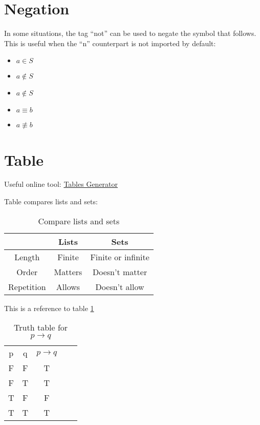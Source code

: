 \documentclass[12pt, letterpaper, oneside]{article}
\begin{document}
\section{Negation}

In some situations, the tag ``not'' can be used to negate the symbol that follows. This is useful when the ``n''
counterpart is not imported by default:

\begin{itemize}
  \item $a \in S$
  \item $a \notin S$
  \item $a \not\in S$
  \item $a \equiv b$
  \item $a \not\equiv b$
\end{itemize}

\section{Table}

Useful online tool: \href{https://www.tablesgenerator.com/}{Tables Generator}

Table compares lists and sets:
\begin{table}[H]
  \centering
  \begin{tabular}{||c c c ||}
    \hline
               & Lists   & Sets               \\ [0.5ex]
    \hline
    \hline
    Length     & Finite  & Finite or infinite \\
    Order      & Matters & Doesn't matter     \\
    Repetition & Allows  & Doesn't allow      \\ [1ex]
    \hline
  \end{tabular}
  \caption{Compare lists and sets}
  \label{table:lists_sets_comp}
\end{table}

This is a reference to table \ref{table:lists_sets_comp}

\begin{table}[H]
  \centering
  \begin{tabular}{|c|c|c|ll}
    \cline{1-3}
    p & q & $p \rightarrow q$ &  & \\ [1ex] \cline{1-3}
    F & F & T                 &  & \\ [0.5ex] \cline{1-3}
    F & T & T                 &  & \\ [0.5ex] \cline{1-3}
    T & F & F                 &  & \\ [0.5ex] \cline{1-3}
    T & T & T                 &  & \\ [0.5ex] \cline{1-3}
  \end{tabular}
  \caption{Truth table for $p \rightarrow q$}
\end{table}
\end{document}
